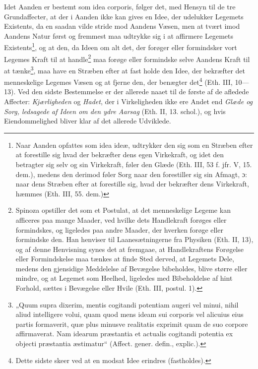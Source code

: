 \documentclass[12pt,a4paper]{book}
\newcommand{\opage}[1]{\marginnote{\footnotesize\textit{[#1]}}}
\begin{document}
\opage{114} \setcounter{footnote}{0}%
Idet Aanden er bestemt som idea corporis, følger det,
med Hensyn til de tre Grundaffecter, at der i Aanden ikke
kan gives en Idee, der udelukker Legemets Existents, da
en saadan vilde stride mod Aandens Væsen, men at tvært\-%
imod Aandens Natur først og fremmest maa udtrykke sig i
at affirmere Legemets
Existents\footnote{Naar Aanden opfattes som idea ideæ,
udtrykker den sig som en Stræben efter at forestille sig hvad
der bekræfter dens egen Virkekraft, og idet den betragter sig
selv og sin Virkekraft, føler den Glæde (Eth. III, 53 f. jfr.
V, 15. dem.), medens den derimod føler Sorg naar den
forestiller sig sin Afmagt, ɔ: naar dens Stræben efter at
forestille sig, hvad der bekræfter dens Virkekraft, hæmmes
(Eth. III, 55. dem.)}, og at den, da Ideen om
alt det, der forøger eller formindsker vort Legemes Kraft
til at
handle\footnote{Spinoza opstiller det som et Postulat, at det
menneskelige Legeme kan afficeres paa mange Maader, ved
hvilke dets Handlekraft forøges eller formindskes, og
ligeledes paa andre Maader, der hverken forøge eller
formindske den. Han henviser til Laanesætningerne fra
Physiken (Eth. II, 13), og af denne Henvisning synes det at
fremgaae, at Handlekraftens Forøgelse eller Formindskelse
maa tænkes at finde Sted derved, at Legemets Dele, medens
den gjensidige Meddelelse af Bevægelse bibeholdes, blive
større eller mindre, og at Legemet som Heelhed, ligeledes
med Bibeholdelse af hint Forhold, sættes i Bevægelse eller
Hvile (Eth. III, postul. 1).} maa forøge eller formindske selve Aandens
Kraft til at
tænke\footnote{„Quum supra dixerim, mentis cogitandi
potentiam augeri vel minui, nihil aliud intelligere volui, quam
quod mens ideam sui corporis vel alicuius eius partis
formaverit, quæ plus minusve realitatis exprimit quam de suo
corpore affirmaverat. Nam idearum præstantia et actualis
cogitandi potentia ex objecti præstantia æstimatur“ (Affect.
gener. defin., explic.).}, maa have en Stræben efter at fast\-%
holde den Idee, der bekræfter det menneskelige Legemes
Væsen og at fjerne den, der benægter
det\footnote{Dette sidste skeer ved at en modsat Idee erindres
(fastholdes).} (Eth. III,
10---13). Ved den sidste Bestemmelse er der allerede naaet
til de første af de afledede Affecter: \emph{Kjærligheden} og
\emph{Hadet}, der i Virkeligheden ikke ere Andet end \emph{Glæde
og Sorg, ledsagede af Ideen om den ydre Aarsag}
\opage{115} %
(Eth. II, 13. schol.), og hvis Eiendommelighed bliver klar
af det allerede Udviklede.
\end{document}
